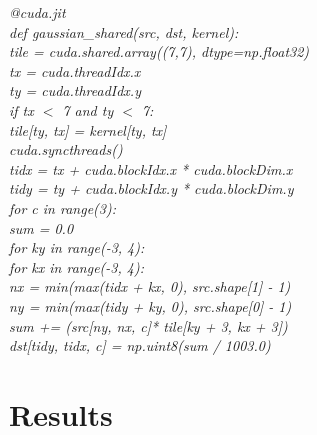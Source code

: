 \documentclass{article}
\begin{document}
\noindent\textit{@cuda.jit} \\
\textit{def gaussian\_shared(src, dst, kernel):} \\
\textit{\hspace*{1.5em}tile = cuda.shared.array((7,7), dtype=np.float32)} \\
\textit{\hspace*{1.5em}tx = cuda.threadIdx.x} \\
\textit{\hspace*{1.5em}ty = cuda.threadIdx.y} \\
\smallskip
\textit{\hspace*{1.5em}if tx $<$ 7 and ty $<$ 7:} \\
\textit{\hspace*{3.0em}tile[ty, tx] = kernel[ty, tx]} \\
\smallskip
\textit{\hspace*{1.5em}cuda.syncthreads()} \\
\textit{\hspace*{1.5em}tidx = tx + cuda.blockIdx.x * cuda.blockDim.x} \\
\textit{\hspace*{1.5em}tidy = ty + cuda.blockIdx.y * cuda.blockDim.y} \\
\smallskip
\textit{\hspace*{1.5em}for c in range(3):} \\
\textit{\hspace*{3.0em}sum = 0.0} \\
\textit{\hspace*{3.0em}for ky in range(-3, 4):} \\
\textit{\hspace*{4.5em}for kx in range(-3, 4):} \\
\textit{\hspace*{6.0em}nx = min(max(tidx + kx, 0), src.shape[1] - 1)} \\
\textit{\hspace*{6.0em}ny = min(max(tidy + ky, 0), src.shape[0] - 1)} \\
\textit{\hspace*{6.0em}sum += (src[ny, nx, c]* tile[ky + 3, kx + 3])} \\
\textit{\hspace*{3.0em}dst[tidy, tidx, c] = np.uint8(sum / 1003.0)}


\section{Results}
\end{document}
